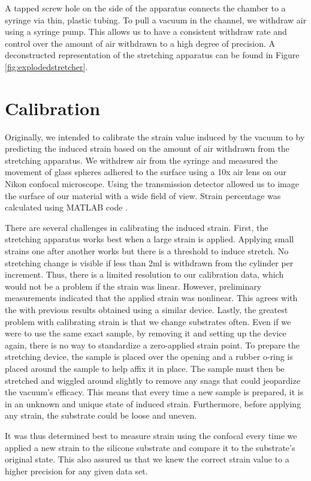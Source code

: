 A tapped screw hole on the side of the apparatus connects the chamber to a syringe via thin, plastic tubing. To pull a vacuum in the channel, we withdraw air using a syringe pump. This allows us to have a consistent withdraw rate and control over the amount of air withdrawn to a high degree of precision. A deconstructed representation of the stretching apparatus can be found in Figure \ref{fig:explodedstretcher}.

\section{Calibration}
Originally, we intended to calibrate the strain value induced by the vacuum to by predicting the induced strain based on the amount of air withdrawn from the stretching apparatus. We withdrew air from the syringe and measured the movement of glass spheres adhered to the surface using a 10x air lens on our Nikon confocal microscope. Using the transmission detector allowed us to image the surface of our material with a wide field of view. Strain percentage was calculated using MATLAB code \cite{xu2017direct}.

There are several challenges in calibrating the induced strain. First, the stretching apparatus works best when a large strain is applied. Applying small strains one after another works but there is a threshold to induce stretch. No stretching change is visible if less than 2ml is withdrawn from the cylinder per increment. Thus, there is a limited resolution to our calibration data, which would not be a problem if the strain was linear. However, preliminary measurements indicated that the applied strain was nonlinear. This agrees with the with previous results \cite{na2008time} obtained using a similar device. Lastly, the greatest problem with calibrating strain is that we change substrates often. Even if we were to use the same exact sample, by removing it and setting up the device again, there is no way to standardize a zero-applied strain point. To prepare the stretching device, the sample is placed over the opening and a rubber o-ring is placed around the sample to help affix it in place. The sample must then be stretched and wiggled around slightly to remove any snags that could jeopardize the vacuum's efficacy. This means that every time a new sample is prepared, it is in an unknown and unique state of induced strain. Furthermore, before applying any strain, the substrate could be loose and uneven.

It was thus determined best to measure strain using the confocal every time we applied a new strain to the silicone substrate and compare it to the substrate's original state. This also assured us that we knew the correct strain value to a higher precision for any given data set.


